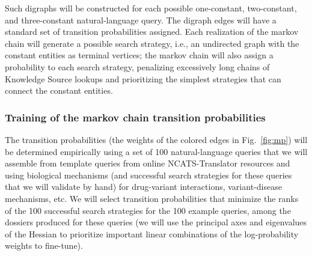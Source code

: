 \documentclass[11pt,notitlepage]{article}
\begin{document}
Such digraphs will be constructed for each possible one-constant, two-constant,
and three-constant natural-language query. The digraph edges will have a
standard set of transition probabilities assigned. Each realization of the
markov chain will generate a possible search strategy, i.e., an undirected graph
with the constant entities as terminal vertices; the markov chain will also
assign a probability to each search strategy, penalizing excessively long chains
of Knowledge Source lookups and prioritizing the simplest strategies that can
connect the constant entities.

\subsubsection{Training of the markov chain transition probabilities}
The transition probabilities (the weights of the
colored edges in Fig.~\ref{fig:mp}) will be determined empirically using a set
of 100 natural-language queries that we will assemble from template queries from
online NCATS-Translator resources and using biological mechanisms (and
successful search strategies for these queries that we will validate by hand)
for drug-variant interactions, variant-disease mechanisms, etc. We will select
transition probabilities that minimize the ranks of the 100 successful search
strategies for the 100 example queries, among the dossiers produced for these
queries (we will use the principal axes and eigenvalues of the Hessian to
prioritize important linear combinations of the log-probability weights to
fine-tune).
\end{document}
